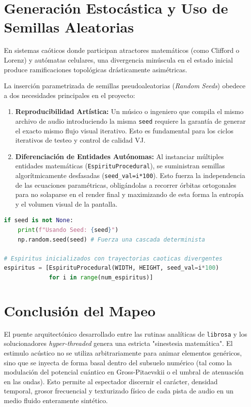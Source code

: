 \documentclass[12pt, openany]{book}
\begin{document}
\section{Generación Estocástica y Uso de Semillas Aleatorias}
En sistemas caóticos donde participan atractores matemáticos (como Clifford o Lorenz) y autómatas celulares, una divergencia minúscula en el estado inicial produce ramificaciones topológicas drásticamente asimétricas. 

La inserción parametrizada de semillas pseudoaleatorias (\textit{Random Seeds}) obedece a dos necesidades principales en el proyecto:
\begin{enumerate}
    \item \textbf{Reproducibilidad Artística:} Un músico o ingeniero que compila el mismo archivo de audio introduciendo la misma \texttt{seed} requiere la garantía de generar el exacto mismo flujo visual iterativo. Esto es fundamental para los ciclos iterativos de testeo y control de calidad VJ.
    \item \textbf{Diferenciación de Entidades Autónomas:} Al instanciar múltiples entidades matemáticas (\texttt{EspirituProcedural}), se suministran semillas algorítmicamente desfasadas (\texttt{seed\_val=i*100}). Esto fuerza la independencia de las ecuaciones paramétricas, obligándolas a recorrer órbitas ortogonales para no solaparse en el render final y maximizando de esta forma la entropía y el volumen visual de la pantalla.
\end{enumerate}

\begin{lstlisting}[language=Python, caption={Uso de semillas en el núcleo de aleatoriedad general y particular.}, label={lst:seed}]
if seed is not None:
    print(f"Usando Seed: {seed}")
    np.random.seed(seed) # Fuerza una cascada determinista 

# Espiritus inicializados con trayectorias caoticas divergentes
espiritus = [EspirituProcedural(WIDTH, HEIGHT, seed_val=i*100) 
             for i in range(num_espiritus)]
\end{lstlisting}

\section{Conclusión del Mapeo}
El puente arquitectónico desarrollado entre las rutinas analíticas de \texttt{librosa} y los solucionadores \textit{hyper-threaded} genera una estricta "sinestesia matemática". El estimulo acústico no se utiliza arbitrariamente para animar elementos genéricos, sino que se inyecta de forma basal dentro del subsuelo numérico (tal como la modulación del potencial cuántico en Gross-Pitaevskii o el umbral de atenuación en las ondas). Esto permite al espectador discernir el carácter, densidad temporal, grosor frecuencial y texturizado físico de cada pista de audio en un medio fluido enteramente sintético.
\end{document}
